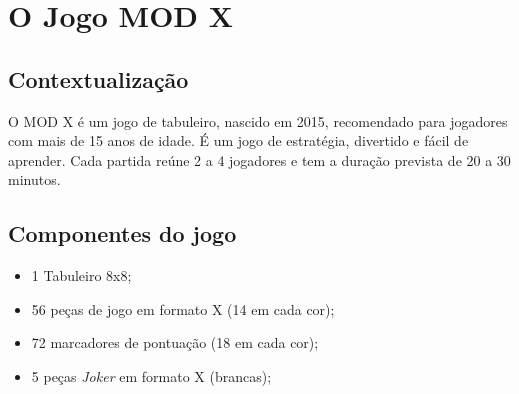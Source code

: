 \documentclass[a4paper]{article}
\begin{document}
%
%
%
%
%
%
%


\section{O Jogo MOD X\newline}

\subsection{Contextualização}
O MOD X é um jogo de tabuleiro, nascido em 2015, recomendado para jogadores com mais de 15 anos de idade.
É um jogo de estratégia, divertido e fácil de aprender.
Cada partida reúne 2 a 4 jogadores e tem a duração prevista de 20 a 30 minutos. 

\subsection{Componentes do jogo}
\begin{itemize}
	\item 1 Tabuleiro 8x8;
	\item 56 peças de jogo em formato X (14 em cada cor);
	\item 72 marcadores de pontuação (18 em cada cor);
	\item 5 peças \textit{Joker} em formato X (brancas);
\end{itemize}
\end{document}
